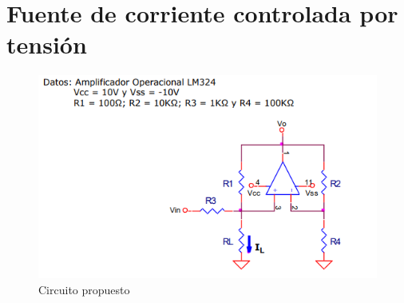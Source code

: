 \newpage
\section{Fuente de corriente controlada por tensión}
\onehalfspacing
\begin{figure}[htb]
	\centering
	\includegraphics[width=1\textwidth]{figuras/circuito2_consigna.png}
	\caption{Circuito propuesto}
\end{figure}

